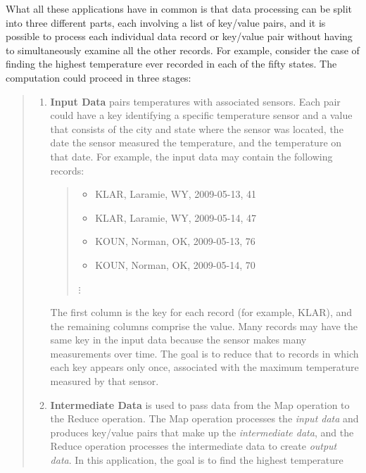 What all these applications have in common is that data processing
can be split into three different parts, each involving a list of
key/value pairs, and it is possible to process each individual
data record or key/value pair without having to simultaneously
examine all the other records.  For
example, consider the case of finding the highest
temperature ever recorded in each of the fifty states.
The computation could proceed in three stages:
\begin{quote}
\begin{enumerate}
    \item \textbf{Input Data} pairs temperatures with associated sensors.
        Each pair could have a key identifying a
        specific temperature sensor and
        a value that consists of the city and state where
        the sensor was located, the date the sensor measured
        the temperature, and the temperature on that date.
        For example, the input data may contain the following
        records:
        \begin {quote}
        \begin{itemize}
            \item \textsf{KLAR, Laramie, WY, 2009-05-13, 41}
            \item \textsf{KLAR, Laramie, WY, 2009-05-14, 47}
            \item \textsf{KOUN, Norman,  OK, 2009-05-13, 76}
            \item \textsf{KOUN, Norman,  OK, 2009-05-14, 70}
        \end{itemize}
        \hspace*{1cm}$\vdots$
        \end{quote}
        The first column is the key for each record (for example, KLAR),
        and the remaining columns comprise the value. Many
        records may have the same key in the input data because the
        sensor makes many measurements over time.
        The goal is to reduce that to records
        in which each key appears only once,
        associated with the maximum temperature measured by that sensor.
    \item \textbf{Intermediate Data} is used to pass data from
        the Map operation to the Reduce operation. The Map operation
        processes the \emph{input data} and produces key/value pairs
        that make up the \emph{intermediate data}, and the Reduce operation
        processes the intermediate data to create \emph{output data}.
        In this application, the goal is to find the highest temperature

\end{enumerate}
\end{quote}

